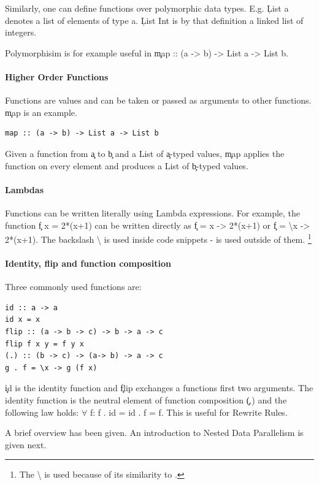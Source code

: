     Similarly, one can define functions over polymorphic data types.
    E.g. \c{List a} denotes a list of elements of type a. \c{List Int}
    is by that definition a linked list of integers.
    
    Polymorphisim is for example useful in \c{map :: (a -> b) -> List a -> List b}.
  
  \paragraph{Higher Order Functions}
    Functions are values and can be taken or passed as arguments to other functions.
    \c{map} is an example.
    \begin{lstlisting}
map :: (a -> b) -> List a -> List b
    \end{lstlisting}
    Given a function from \c{a} to \c{b} and a List of \c{a}-typed values,
    \c{map} applies the function on every element and produces a List
    of \c{b}-typed values.
    
  \paragraph{Lambdas}
    Functions can be written literally using Lambda expressions.
    For example, the function \c{f x = 2*(x+1)} can be written
    directly as \c{f = \lam x -> 2*(x+1)} or \c{f = \textbackslash{x} -> 2*(x+1)}.
    The backslash \textbackslash{} is used inside code snippets - \lam{} is used outside of them.
    \footnote{The \textbackslash{} is used because of its similarity to \lam.}
    
  \paragraph{Identity, flip and function composition}
    Three commonly used functions are:
    \begin{lstlisting}
id :: a -> a
id x = x
flip :: (a -> b -> c) -> b -> a -> c
flip f x y = f y x
(.) :: (b -> c) -> (a-> b) -> a -> c
g . f = \x -> g (f x)
    \end{lstlisting}
    \c{id} is the identity function and \c{flip} exchanges a functions
    first two arguments.
    The identity function is the neutral element of function composition \c{(.)}
    and the following law holds:
     \c{\textrm{$\forall$} f: f . id = id . f = f}. This is useful for Rewrite Rules.


  \p
  A brief overview has been given. An introduction to Nested Data Parallelism is given next.



